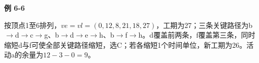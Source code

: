 {\color{ink}\bfseries 例 6-6}\par\vspace{1bp}按顶点1至6排列，\(ve=\allowbreak{}vl=\allowbreak{}(0,\allowbreak{}12,\allowbreak{}8,\allowbreak{}21,\allowbreak{}18,\allowbreak{}27)\)，工期为27；三条关键路径为b\(\to \)d\(\to \)c\(\to \)g、b\(\to \)d\(\to \)e\(\to \)h、b\(\to \)f\(\to \)h。d覆盖前两条，f覆盖第三条，同时缩短d与f可使全部关键路径缩短，选C；若各缩短1个时间单位，新工期为26。活动a的余量为\(12-3-0=\allowbreak{}9\)。
